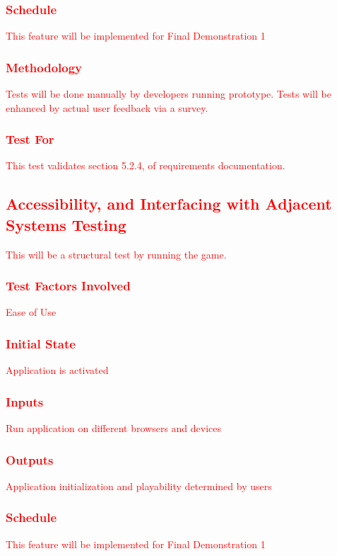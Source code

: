 \documentclass[11pt, oneside]{article}   	%
\begin{document}
\subsubsection{\textcolor{red}{Schedule}}
\textcolor{red}{This feature will be implemented for Final Demonstration 1}
\subsubsection{\textcolor{red}{Methodology}}
\textcolor{red}{Tests will be done manually by developers running prototype. Tests will be enhanced by actual user feedback via a survey.}
\subsubsection{\textcolor{red}{Test For}}
\textcolor{red}{This test validates section 5.2.4, of requirements documentation.}



\subsection{\textcolor{red}{Accessibility, and Interfacing with Adjacent Systems Testing}}
\textcolor{red}{This will be a structural test by running the game.}
\subsubsection{\textcolor{red}{Test Factors Involved}}
\textcolor{red}{Ease of Use}
\subsubsection{\textcolor{red}{Initial State}}
\textcolor{red}{Application is activated}
\subsubsection{\textcolor{red}{Inputs}}
\textcolor{red}{Run application on different browsers and devices}
\subsubsection{\textcolor{red}{Outputs}}
\textcolor{red}{Application initialization and playability determined by users}
\subsubsection{\textcolor{red}{Schedule}}
\textcolor{red}{This feature will be implemented for Final Demonstration 1}
\end{document}
